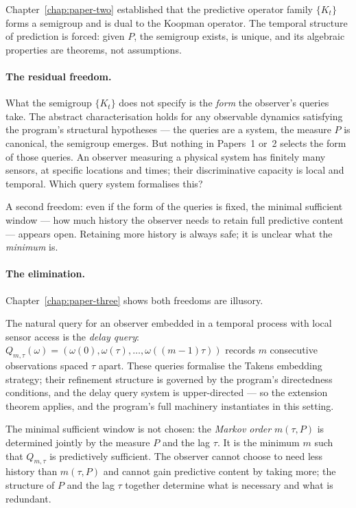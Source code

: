 
Chapter~\ref{chap:paper-two} established that the predictive operator
family $\{K_t\}$ forms a semigroup and is dual to the Koopman operator.
The temporal structure of prediction is forced: given $P$, the semigroup
exists, is unique, and its algebraic properties are theorems, not
assumptions.

\medskip

\paragraph{The residual freedom.}
What the semigroup $\{K_t\}$ does not specify is the \emph{form} the
observer's queries take.  The abstract characterisation holds for any
observable dynamics satisfying the program's structural hypotheses ---
the queries are a system, the measure $P$ is canonical, the semigroup
emerges.  But nothing in Papers~1 or~2 selects the form of those
queries.  An observer measuring a physical system has finitely many
sensors, at specific locations and times; their discriminative capacity
is local and temporal.  Which query system formalises this?

A second freedom: even if the form of the queries is fixed, the minimal
sufficient window --- how much history the observer needs to retain full
predictive content --- appears open.  Retaining more history is
always safe; it is unclear what the \emph{minimum} is.

\medskip

\paragraph{The elimination.}
Chapter~\ref{chap:paper-three} shows both freedoms are illusory.

The natural query for an observer embedded in a temporal process with
local sensor access is the \emph{delay query}: $Q_{m,\tau}(\omega) =
(\omega(0), \omega(\tau), \ldots, \omega((m-1)\tau))$ records $m$
consecutive observations spaced $\tau$ apart.  These queries formalise
the Takens embedding strategy; their refinement structure is governed
by the program's directedness conditions, and the delay query system
is upper-directed --- so the extension theorem applies, and the program's
full machinery instantiates in this setting.

The minimal sufficient window is not chosen: the \emph{Markov order}
$m(\tau, P)$ is determined jointly by the measure $P$ and the lag $\tau$.
It is the minimum $m$ such that $Q_{m,\tau}$ is predictively sufficient.
The observer cannot choose to need less history than $m(\tau,P)$ and
cannot gain predictive content by taking more; the structure of $P$ and
the lag $\tau$ together determine what is necessary and what is redundant.

